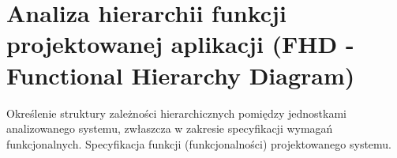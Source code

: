 \section{Analiza hierarchii funkcji projektowanej aplikacji (FHD - Functional Hierarchy
Diagram)}
Określenie struktury zależności hierarchicznych pomiędzy jednostkami
analizowanego systemu, zwłaszcza w zakresie specyfikacji wymagań funkcjonalnych.
Specyfikacja funkcji (funkcjonalności) projektowanego systemu.